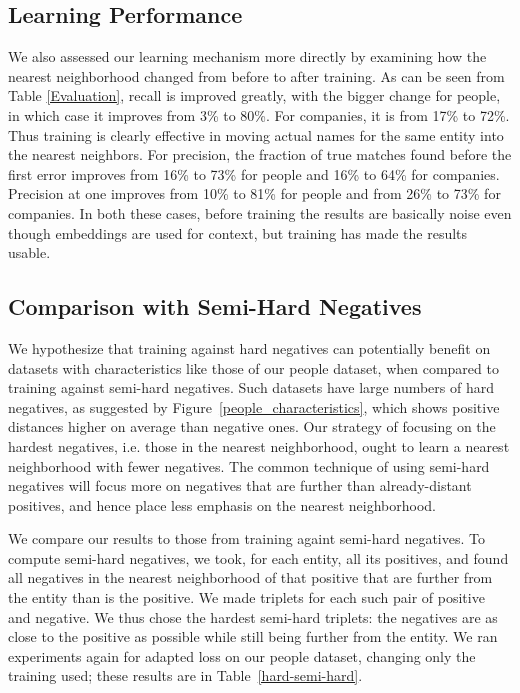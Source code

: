 \subsection{Learning Performance}

 We also assessed our learning mechanism more directly by examining how the nearest neighborhood changed from before to after training.  As can be seen from Table \ref{Evaluation}, recall is improved greatly, with the bigger change for people, in which case it improves from 3\% to 80\%.  For companies, it is from 17\% to 72\%.  Thus training is clearly effective in moving actual names for the same entity into the nearest neighbors.  For precision, the fraction of true matches found before the first error improves from 16\% to 73\% for people and 16\% to 64\% for companies.  Precision at one improves from 10\% to 81\% for people and from 26\% to 73\% for companies.  In both these cases, before training the results are basically noise even though embeddings are used for context, but training has made the results usable.

\subsection{Comparison with Semi-Hard Negatives}

 We hypothesize that training against hard negatives can potentially benefit on datasets with characteristics like those of our people dataset, when compared to training against semi-hard negatives.  Such datasets have large numbers of hard negatives, as suggested by Figure~\ref{people_characteristics}, which shows positive distances higher on average than negative ones.  Our strategy of focusing on the hardest negatives, i.e. those in the nearest neighborhood, ought to learn a nearest neighborhood with fewer negatives.  The common technique of using semi-hard negatives will focus more on negatives that are further than already-distant positives, and hence place less emphasis on the nearest neighborhood.

We compare our results to those from training againt semi-hard negatives.  To compute semi-hard negatives, we took, for each entity, all its positives, and found all negatives in the nearest neighborhood of that positive that are further from the entity than is the positive.  We made triplets for each such pair of positive and negative.  We thus chose the hardest semi-hard triplets: the negatives are as close to the positive as possible while still being further from the entity.  We ran experiments again for adapted loss on our people dataset, changing only the training used; these results are in Table~\ref{hard-semi-hard}.

